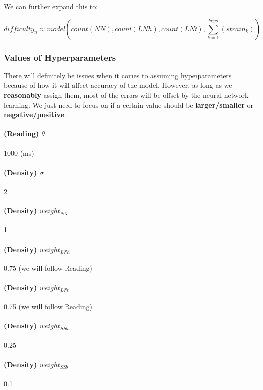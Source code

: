 We can further expand this to:

$$ difficulty_n \approx model \left( count(NN), count(LNh), count(LNt), \sum_{k=1}^{keys} \left(strain_k \right)  \right)  $$

\subsubsection{Values of Hyperparameters}

There will definitely be issues when it comes to assuming hyperparameters because of how it will affect accuracy of the model. However, as long as we \textbf{reasonably} assign them, most of the errors will be offset by the neural network learning. We just need to focus on if a certain value should be \textbf{larger/smaller} or \textbf{negative/positive}.

\paragraph{(Reading) $\theta$} 1000 (ms)

\paragraph{(Density) $\sigma$} 2

\paragraph{(Density) $weight_{NN}$} 1
\paragraph{(Density) $weight_{LNh}$} 0.75 (we will follow Reading)
\paragraph{(Density) $weight_{LNt}$} 0.75 (we will follow Reading)
\paragraph{(Density) $weight_{SSh}$} 0.25
\paragraph{(Density) $weight_{SSb}$} 0.1


